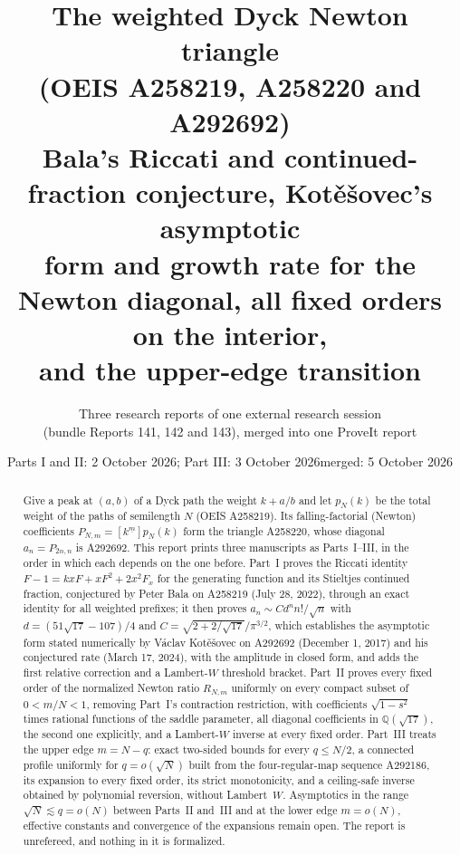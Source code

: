 \documentclass[11pt,letterpaper]{article}
\title{\textbf{The weighted Dyck Newton triangle\\ (OEIS A258219, A258220 and A292692)}\\[7pt]
\large Bala's Riccati and continued-fraction conjecture, Kot\v{e}\v{s}ovec's asymptotic\\ form and growth rate for the Newton diagonal, all fixed orders on the interior,\\ and the upper-edge transition}
\author{Three research reports of one external research session\\(bundle Reports 141, 142 and 143), merged into one ProveIt report}
\date{Parts I and II: 2 October 2026; Part III: 3 October 2026\quad merged: 5 October 2026}
\theoremstyle{remark}\newtheorem{remark}[theorem]{Remark}
\newcommand{\fall}[2]{#1^{\underline{#2}}}
\newcommand{\Q}{\mathbb Q}
\begin{document}
\hypersetup{pageanchor=false}
\maketitle
\begin{abstract}
Give a peak at $(a,b)$ of a Dyck path the weight $k+a/b$ and let $p_N(k)$ be the total weight of the paths of semilength $N$ (OEIS A258219). Its falling-factorial (Newton) coefficients $P_{N,m}=[\fall km]p_N(k)$ form the triangle A258220, whose diagonal $a_n=P_{2n,n}$ is A292692. This report prints three manuscripts as Parts~I--III, in the order in which each depends on the one before. Part~I proves the Riccati identity $F-1=kxF+xF^2+2x^2F_x$ for the generating function and its Stieltjes continued fraction, conjectured by Peter Bala on A258219 (July 28, 2022), through an exact identity for all weighted prefixes; it then proves $a_n\sim Cd^nn!/\sqrt n$ with $d=(51\sqrt{17}-107)/4$ and $C=\sqrt{2+2/\sqrt{17}}/\pi^{3/2}$, which establishes the asymptotic form stated numerically by V\'aclav Kot\v{e}\v{s}ovec on A292692 (December 1, 2017) and his conjectured rate (March 17, 2024), with the amplitude in closed form, and adds the first relative correction and a Lambert-$W$ threshold bracket. Part~II proves every fixed order of the normalized Newton ratio $R_{N,m}$ uniformly on every compact subset of $0<m/N<1$, removing Part~I's contraction restriction, with coefficients $\sqrt{1-s^2}$ times rational functions of the saddle parameter, all diagonal coefficients in $\Q(\sqrt{17})$, the second one explicitly, and a Lambert-$W$ inverse at every fixed order. Part~III treats the upper edge $m=N-q$: exact two-sided bounds for every $q\le N/2$, a connected profile uniformly for $q=o(\sqrt N)$ built from the four-regular-map sequence A292186, its expansion to every fixed order, its strict monotonicity, and a ceiling-safe inverse obtained by polynomial reversion, without Lambert~$W$. Asymptotics in the range $\sqrt N\lesssim q=o(N)$ between Parts~II and~III and at the lower edge $m=o(N)$, effective constants and convergence of the expansions remain open. The report is unrefereed, and nothing in it is formalized.
\end{abstract}
\hypersetup{pageanchor=true}
\setcounter{tocdepth}{1}
{\small\setlength{\parskip}{0pt}\tableofcontents}
\newpage
\setlength{\parskip}{4pt}
\end{document}
